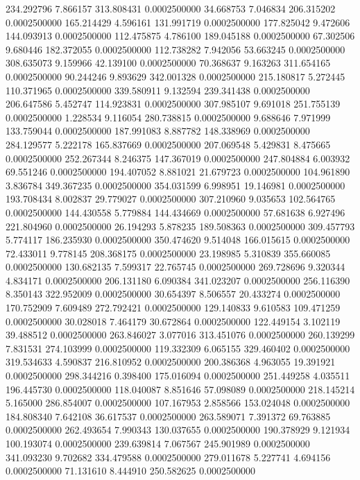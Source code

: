 234.292796 7.866157 313.808431 0.0002500000
34.668753 7.046834 206.315202 0.0002500000
165.214429 4.596161 131.991719 0.0002500000
177.825042 9.472606 144.093913 0.0002500000
112.475875 4.786100 189.045188 0.0002500000
67.302506 9.680446 182.372055 0.0002500000
112.738282 7.942056 53.663245 0.0002500000
308.635073 9.159966 42.139100 0.0002500000
70.368637 9.163263 311.654165 0.0002500000
90.244246 9.893629 342.001328 0.0002500000
215.180817 5.272445 110.371965 0.0002500000
339.580911 9.132594 239.341438 0.0002500000
206.647586 5.452747 114.923831 0.0002500000
307.985107 9.691018 251.755139 0.0002500000
1.228534 9.116054 280.738815 0.0002500000
9.688646 7.971999 133.759044 0.0002500000
187.991083 8.887782 148.338969 0.0002500000
284.129577 5.222178 165.837669 0.0002500000
207.069548 5.429831 8.475665 0.0002500000
252.267344 8.246375 147.367019 0.0002500000
247.804884 6.003932 69.551246 0.0002500000
194.407052 8.881021 21.679723 0.0002500000
104.961890 3.836784 349.367235 0.0002500000
354.031599 6.998951 19.146981 0.0002500000
193.708434 8.002837 29.779027 0.0002500000
307.210960 9.035653 102.564765 0.0002500000
144.430558 5.779884 144.434669 0.0002500000
57.681638 6.927496 221.804960 0.0002500000
26.194293 5.878235 189.508363 0.0002500000
309.457793 5.774117 186.235930 0.0002500000
350.474620 9.514048 166.015615 0.0002500000
72.433011 9.778145 208.368175 0.0002500000
23.198985 5.310839 355.660085 0.0002500000
130.682135 7.599317 22.765745 0.0002500000
269.728696 9.320344 4.834171 0.0002500000
206.131180 6.090384 341.023207 0.0002500000
256.116390 8.350143 322.952009 0.0002500000
30.654397 8.506557 20.433274 0.0002500000
170.752909 7.609489 272.792421 0.0002500000
129.140833 9.610583 109.471259 0.0002500000
30.028018 7.464179 30.672864 0.0002500000
122.449154 3.102119 39.488512 0.0002500000
263.846027 3.077016 313.451076 0.0002500000
260.139299 7.831531 274.103999 0.0002500000
119.332309 6.065155 329.460402 0.0002500000
319.534633 4.590837 216.810952 0.0002500000
200.386368 4.963055 19.391921 0.0002500000
298.344216 0.398400 175.016094 0.0002500000
251.449258 4.035511 196.445730 0.0002500000
118.040087 8.851646 57.098089 0.0002500000
218.145214 5.165000 286.854007 0.0002500000
107.167953 2.858566 153.024048 0.0002500000
184.808340 7.642108 36.617537 0.0002500000
263.589071 7.391372 69.763885 0.0002500000
262.493654 7.990343 130.037655 0.0002500000
190.378929 9.121934 100.193074 0.0002500000
239.639814 7.067567 245.901989 0.0002500000
341.093230 9.702682 334.479588 0.0002500000
279.011678 5.227741 4.694156 0.0002500000
71.131610 8.444910 250.582625 0.0002500000

